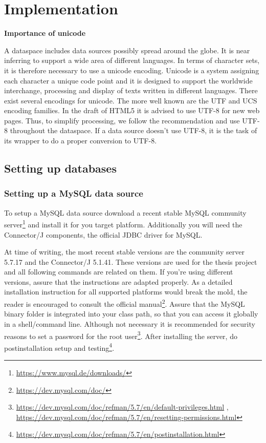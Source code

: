 \chapter{Implementation}

\textbf{Importance of unicode}

A dataspace includes data sources possibly spread around the globe. It is near inferring to support a wide area of different languages. In terms of character sets, it is therefore necessary to use a unicode encoding.
Unicode is a system assigning each character a unique code point and it is designed to support the worldwide interchange, processing and display of texts written in different languages\cite{UnicodeStandard}.\newline
There exist several encodings for unicode. The more well known are the UTF and UCS encoding families. In the draft of HTML5 it is advised to use UTF-8 for new web pages\cite{HTML5Rec}. 
Thus, to simplify processing, we follow the recommendation and use UTF-8 throughout the dataspace. If a data source doesn't use UTF-8, it is the task of its wrapper to do a proper conversion to UTF-8.

\section{Setting up databases}


\subsection{Setting up a MySQL data source}

To setup a MySQL data source download a recent stable MySQL community server\footnote{\url{https://www.mysql.de/downloads/}} 
and install it for you target platform. Additionally you will need the Connector/J components, the official JDBC driver for MySQL. 

At time of writing, the most recent stable versions are the community server 5.7.17 and the Connector/J 5.1.41. These versions are used for the thesis project and all following commands are related on them. If you're using 
different versions, assure that the instructions are adapted properly. As a detailed installation instruction for all supported platforms would break the mold, the reader is encouraged to consult the official 
manual\footnote{\url{https://dev.mysql.com/doc/}}. 
Assure that the MySQL binary folder is integrated into your class path, so that you can access it globally in a shell/command line. Although not necessary it is recommended for security reasons 
to set a password for the root user\footnote{\url{https://dev.mysql.com/doc/refman/5.7/en/default-privileges.html} , \url{https://dev.mysql.com/doc/refman/5.7/en/resetting-permissions.html}}. 
After installing the server, do postinstallation setup and testing\footnote{\url{https://dev.mysql.com/doc/refman/5.7/en/postinstallation.html}}. 

